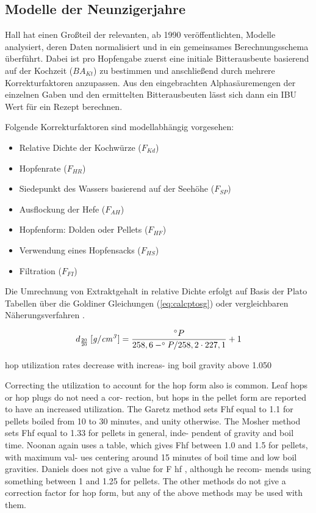 \documentclass[a4paper,parskip=half]{scrartcl}
\newcommand{\BAKt}{{\mathit{BA}}_{\mathit{Kt}}}
\newcommand{\uden}{\:[\mathit{g/cm^3}]}
\newcommand{\FKd}{F_{\mathit{Kd}}}
\newcommand{\FHR}{F_{\mathit{HR}}}
\newcommand{\FSP}{F_{\mathit{SP}}}
\newcommand{\FAH}{F_{\mathit{AH}}}
\newcommand{\FHF}{F_{\mathit{HF}}}
\newcommand{\FHS}{F_{\mathit{HS}}}
\newcommand{\FFil}{F_{\mathit{FI}}}
\begin{document}
\subsection*{Modelle der Neunzigerjahre}

Hall hat einen Großteil der relevanten, ab 1990 veröffentlichten, Modelle analysiert,
deren Daten normalisiert und in ein gemeinsames Berechnungsschema überführt. Dabei ist
pro Hopfengabe zuerst eine initiale Bitterausbeute basierend auf der Kochzeit
($\BAKt$) zu bestimmen und anschließend durch mehrere Korrekturfaktoren anzupassen.
Aus den eingebrachten Alphasäuremengen der einzelnen Gaben und den ermittelten
Bitterausbeuten lässt sich dann ein IBU Wert für ein Rezept berechnen. \parencite[59-65]{Hall1997}


Folgende Korrekturfaktoren sind modellabhängig vorgesehen:

\begin{itemize}
\item Relative Dichte der Kochwürze ($\FKd$)
\item Hopfenrate ($\FHR$)
\item Siedepunkt des Wassers basierend auf der Seehöhe ($\FSP$)
\item Ausflockung der Hefe ($\FAH$)
\item Hopfenform: Dolden oder Pellets ($\FHF$)
\item Verwendung eines Hopfensacks ($\FHS$)
\item Filtration ($\FFil$)
\end{itemize}

Die Umrechnung von Extraktgehalt in relative Dichte erfolgt auf Basis
der Plato Tabellen über die Goldiner Gleichungen (\autoref{eq:calcptosg})
oder vergleichbaren Näherungsverfahren \parencite[140\psq]{Spedding2016}.

\begin{equation}
d_{\frac{20}{20}} \uden = \frac{\degree P}{258,6 - \degree P / 258,2 \cdot 227,1} + 1
\label{eq:calcptosg}
\end{equation}

\parencite[62]{Hall1997}
hop utilization rates decrease with increas-
ing boil gravity above 1.050

Correcting the utilization to
account for the hop form also is common.
Leaf hops or hop plugs do not need a cor-
rection, but hops in the pellet form are
reported to have an increased utilization.
The Garetz method sets Fhf equal to 1.1 for
pellets boiled from 10 to 30 minutes, and
unity otherwise. The Mosher method sets
Fhf equal to 1.33 for pellets in general, inde-
pendent of gravity and boil time. Noonan
again uses a table, which gives Fhf between
1.0 and 1.5 for pellets, with maximum val-
ues centering around 15 minutes of boil
time and low boil gravities. Daniels does not
give a value for F hf , although he recom-
mends using something between 1 and 1.25
for pellets. The other methods do not give
a correction factor for hop form, but any of
the above methods may be used with them.
\end{document}
